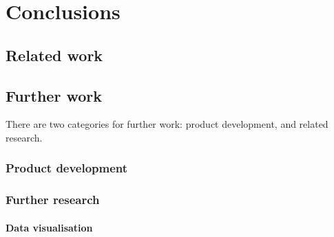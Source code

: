 \chapter{Conclusions}\label{chap:conclusions}







\cite{cummins2014pip-db}
\cite{cummins2014migrating}

\section{Related work}\label{sec:related-work}


\section{Further work}\label{sec:further-work}

There are two categories for further work: product development, and
related research.


\subsection{Product development}


\subsection{Further research}

\subsubsection*{Data visualisation}

